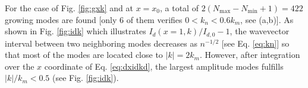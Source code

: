 \documentclass[
 reprint,
 amsmath,amssymb,
 aps,
]{revtex4-1}
\begin{document}
For the case of Fig. \ref{fig:gxk} and  at $x=x_0$, a total of $2(N_\mathrm{max}-N_\mathrm{min}+1) = 422$ growing modes are  found [only 6 of them verifies $0<k_n<0.6k_m$, see (a,b)]. As shown in  Fig. \ref{fig:idk} which illustrates $I_d(x=1, k)/I_{d,0}-1$, the wavevector interval between two neighboring modes decreases as $n^{-1/2}$ [see Eq. \eqref{eq:kn}] so that  most of the modes are located close to $\vert k \vert = 2k_m$. However, after integration over the $x$ coordinate  of Eq. \eqref{eq:dxidkd}, the largest amplitude modes fulfills $\vert k \vert /k_m<0.5$ (see Fig. \ref{fig:idk}).
\end{document}
